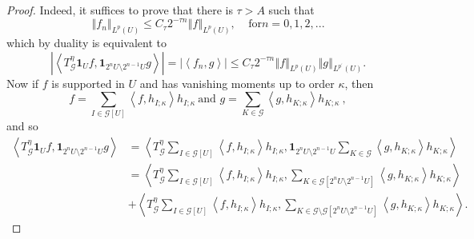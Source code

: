 \documentclass[10pt,a4paper]{amsart}
\begin{document}
\begin{proof}
Indeed, it suffices to prove that there is $\tau>A$ such that
\[
\left\Vert f_{n}\right\Vert _{L^{p}\left(  U\right)  }\leq C_{\tau}2^{-\tau
n}\left\Vert f\right\Vert _{L^{p}\left(  U\right)  },\ \ \ \ \ \text{for
}n=0,1,2,...
\]
which by duality is equivalent to
\[
\left\vert \left\langle T_{\mathcal{G}}^{\eta}\mathbf{1}_{U}f,\mathbf{1}%
_{2^{n}U\setminus2^{n-1}U}g\right\rangle \right\vert =\left\vert \left\langle
f_{n},g\right\rangle \right\vert \leq C_{\tau}2^{-\tau n}\left\Vert
f\right\Vert _{L^{p}\left(  U\right)  }\left\Vert g\right\Vert _{L^{p^{\prime
}}\left(  U\right)  }.
\]
Now if $f$ is supported in $U$ and has vanishing moments up to order $\kappa$,
then%
\[
f=\sum_{I\in\mathcal{G}\left[  U\right]  }\left\langle f,h_{I;\kappa
}\right\rangle h_{I;\kappa}\ \text{and }g=\sum_{K\in\mathcal{G}}\left\langle
g,h_{K;\kappa}\right\rangle h_{K;\kappa}\ ,
\]
and so%
\begin{align}
\left\langle T_{\mathcal{G}}^{\eta}\mathbf{1}_{U}f,\mathbf{1}_{2^{n}%
U\setminus2^{n-1}U}g\right\rangle  & =\left\langle T_{\mathcal{G}}^{\eta}%
\sum_{I\in\mathcal{G}\left[  U\right]  }\left\langle f,h_{I;\kappa
}\right\rangle h_{I;\kappa},\mathbf{1}_{2^{n}U\setminus2^{n-1}U}\sum
_{K\in\mathcal{G}}\left\langle g,h_{K;\kappa}\right\rangle h_{K;\kappa
}\right\rangle \label{<Tf,g>}\\
& =\left\langle T_{\mathcal{G}}^{\eta}\sum_{I\in\mathcal{G}\left[  U\right]
}\left\langle f,h_{I;\kappa}\right\rangle h_{I;\kappa},\sum_{K\in
\mathcal{G}\left[  2^{n}U\setminus2^{n-1}U\right]  }\left\langle
g,h_{K;\kappa}\right\rangle h_{K;\kappa}\right\rangle \nonumber\\
& +\left\langle T_{\mathcal{G}}^{\eta}\sum_{I\in\mathcal{G}\left[  U\right]
}\left\langle f,h_{I;\kappa}\right\rangle h_{I;\kappa},\sum_{K\in
\mathcal{G}\setminus\mathcal{G}\left[  2^{n}U\setminus2^{n-1}U\right]
}\left\langle g,h_{K;\kappa}\right\rangle h_{K;\kappa}\right\rangle .\nonumber
\end{align}



\end{proof}
\end{document}
